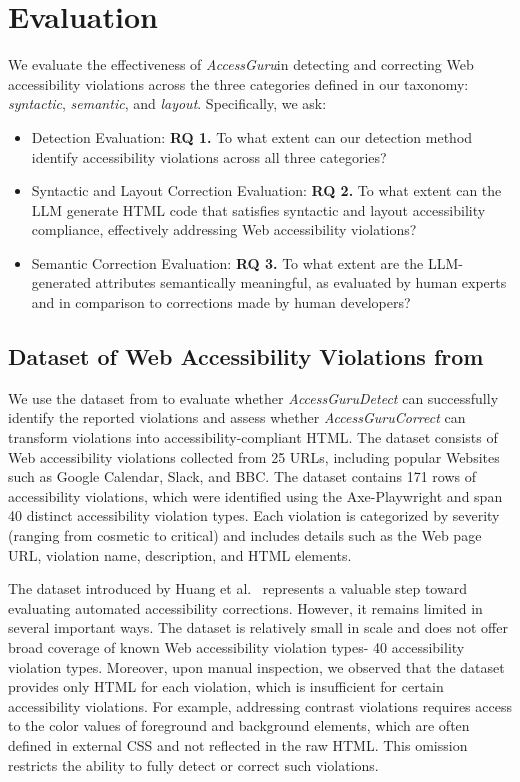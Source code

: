 \documentclass[sigconf, nonacm]{acmart}
\newcommand{\method}{\emph{AccessGuru}}
\begin{document}
\section{Evaluation}
We evaluate the effectiveness of \method \space in detecting and correcting Web accessibility violations across the three categories defined in our taxonomy: \emph{syntactic}, \emph{semantic}, and \emph{layout}. Specifically, we ask: 

\begin{itemize}
\item Detection Evaluation: \textbf{RQ 1.} To what extent can our detection method identify accessibility violations across all three categories?
\item Syntactic and Layout Correction Evaluation: \textbf{RQ 2.} To what extent can the LLM generate HTML code that satisfies syntactic and layout accessibility compliance, effectively addressing Web accessibility violations?
    \item Semantic Correction Evaluation: \textbf{RQ 3.}  To what extent are the LLM-generated attributes semantically meaningful, as evaluated by human experts and in comparison to corrections made by human developers?
\end{itemize}

\subsection{Dataset of Web Accessibility Violations from \cite{DBLP:journals/corr/abs-2401-16450}}
We use the dataset from \cite{DBLP:journals/corr/abs-2401-16450} to evaluate whether \method \emph{Detect} can successfully identify the reported violations and assess whether \method \emph{Correct} can transform violations into accessibility-compliant HTML. The dataset consists of Web accessibility violations collected from 25 URLs, including popular Websites such as Google Calendar, Slack, and BBC. The dataset contains 171 rows of accessibility violations, which were identified using the Axe-Playwright and span 40 distinct accessibility violation types. Each violation is categorized by severity (ranging from cosmetic to critical) and includes details such as the Web page URL, violation name, description, and HTML elements.  

The dataset introduced by Huang et al.~\cite{DBLP:journals/corr/abs-2401-16450} represents a valuable step toward evaluating automated accessibility corrections. However, it remains limited in several important ways. The dataset is relatively small in scale and does not offer broad coverage of known Web accessibility violation types- 40 accessibility violation types. Moreover, upon manual inspection, we observed that the dataset provides only HTML for each violation, which is insufficient for certain accessibility violations. For example, addressing contrast violations requires access to the color values of foreground and background elements, which are often defined in external CSS and not reflected in the raw HTML. This omission restricts the ability to fully detect or correct such violations.
\end{document}
